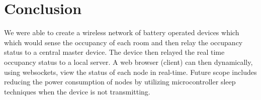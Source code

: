 \chapter{Conclusion}
We were able to create a wireless network of battery operated
devices which which would sense the occupancy of each
room and then relay the occupancy status to a central master
device. The device then relayed the real time occupancy status
to a local server. A web browser (client) can then dynamically,
using websockets, view the status of each node in real-time.
Future scope includes reducing the power consumption of
nodes by utilizing microcontroller sleep techniques when the
device is not transmitting.